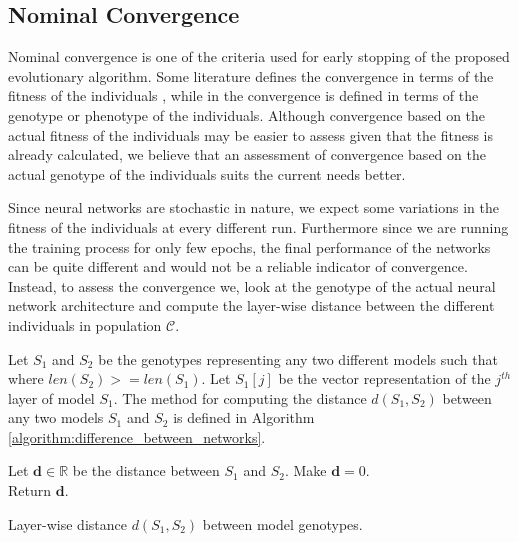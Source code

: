 \documentclass[preprint,12pt]{elsarticle}%
\begin{document}
\subsection{Nominal Convergence}
\label{sec:convergence}

Nominal convergence is one of the criteria used for early stopping of the proposed evolutionary algorithm. Some literature defines the convergence in terms of the fitness of the individuals \cite{Engelbrecht2007}, while in \cite{Krishnakumar1989} the convergence is defined in terms of the genotype or phenotype of the individuals. Although convergence based on the actual fitness of the individuals may be easier to assess given that the fitness is already calculated, we believe that an assessment of convergence based on the actual genotype of the individuals suits the current needs better.

Since neural networks are stochastic in nature, we expect some variations in the fitness of the individuals at every different run. Furthermore since we are running the training process for only few epochs, the final performance of the networks can be quite different and would not be a reliable indicator of convergence. Instead, to assess the convergence we, look at the genotype of the actual neural network architecture and compute the layer-wise distance between the different individuals in population $\mathcal{C}$.

Let $S_1$ and $S_2$ be the genotypes representing any two different models such that  where $len(S_2) >= len(S_1)$. Let $S_1[j]$ be the vector representation of the $j^{th}$ layer of model $S_1$. The method for computing the distance $d(S_1, S_2)$ between any two models $S_1$ and $S_2$ is defined in Algorithm \ref{algorithm:difference_between_networks}.


\begin{algorithm}[H]
\SetAlgoLined
{}


\BlankLine

Let $\mathbf{d} \in \mathbb{R}$ be the distance between $S_1$ and $S_2$. Make $\mathbf{d} = 0$.\\
Return $\mathbf{d}$.
\caption{Layer-wise distance $d(S_1, S_2)$ between model genotypes.}
\label{algorithm:difference_between_networks}
\end{algorithm}
\end{document}
